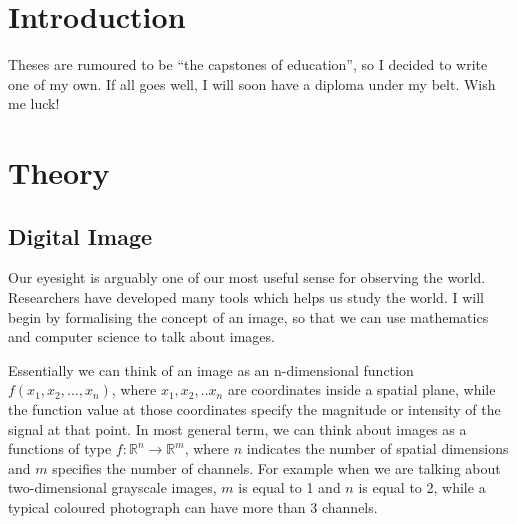 \documentclass[
  digital,     %
  oneside,     %
  nosansbold,  %
  nocolorbold, %
  lof,         %
  lot,         %
]{fithesis4}
\newcommand*{\R}{\ensuremath{\mathbb{R}}}
\begin{document}
\chapter*{Introduction}

Theses are rumoured to be \enquote{the capstones of education}, so
I decided to write one of my own. If all goes well, I will soon
have a diploma under my belt. Wish me luck!

\chapter{Theory}

\section{Digital Image}

Our eyesight is arguably one of our most useful sense for observing the world.
Researchers have developed many tools which helps us study the world. I will
begin by formalising the concept of an image, so that we can use mathematics
and computer science to talk about images.

Essentially we can think of an image as an n-dimensional function $f(x_1, x_2,
..., x_n)$, where $x_1, x_2, .. x_n$ are coordinates inside a spatial plane,
while the function value at those coordinates specify the magnitude or intensity
of the signal at that point. In most general term, we can think about images as
a functions of type $f:\R^n \rightarrow \R^m$, where $n$ indicates the number of
spatial dimensions and $m$ specifies the number of channels. For example when
we are talking about two-dimensional grayscale images, $m$ is equal to 1 and $n$ is
equal to 2, while a typical coloured photograph can have more than 3 channels.
\end{document}
